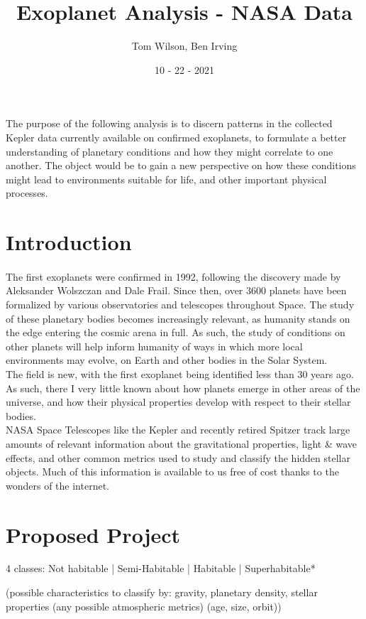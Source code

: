 \documentclass[12pt]{article}
\title{Exoplanet Analysis - NASA Data}
\author{Tom Wilson, Ben Irving}
\date{10 - 22 - 2021}
\begin{document}
\maketitle

\abstract
The purpose of the following analysis is to discern patterns in the collected Kepler data currently available on confirmed exoplanets, to formulate a better understanding of planetary conditions and how they might correlate to one another. The object would be to gain a new perspective on how these conditions might lead to environments suitable for life, and other important physical processes. 
\section{Introduction}
\paragraph*{}

 \indent The first exoplanets were confirmed in 1992, following the discovery made by Aleksander Wolszczan and Dale Frail. Since then, over 3600 planets have been formalized by various observatories and telescopes throughout Space. The study of these planetary bodies becomes increasingly relevant, as humanity stands on the edge entering the cosmic arena in full. As such, the study of conditions on other planets will help inform humanity of ways in which more local environments may evolve, on Earth and other bodies in the Solar System. 
\\
\indent The field is new, with the first exoplanet being identified less than 30 years ago. As such, there I very little known about how planets emerge in other areas of the universe, and how their physical properties develop with respect to their stellar bodies. \\
\indent NASA Space Telescopes like the Kepler and recently retired Spitzer track large amounts of relevant information about the gravitational properties, light \& wave effects, and other common metrics used to study and classify the hidden stellar objects. Much of this information is available to us free of cost thanks to the wonders of the internet.
\section{Proposed Project}
4 classes: 
Not habitable | Semi-Habitable | Habitable | Superhabitable*

(possible characteristics to classify by: gravity, planetary density, stellar properties 
(any possible atmospheric metrics)
(age, size, orbit))
\end{document}
